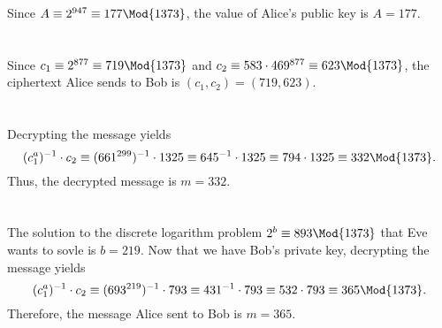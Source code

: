 \documentclass[
  coursecode={MTHE 418},
  assignmentname={Homework \homeworknumber},
  studentnumber=20053722,
  name={Bryan Hoang},
  draft,
]{
  ltxanswer%
}
\begin{document}
  \begin{questions}
    \setcounter{question}{\questionnumber}
    \addtocounter{question}{-1}
    \question[10]\
    \begin{parts}
      \part{}
      \begin{solution}
        Since \(A\equiv2^{947}\equiv 177 \Mod{1373}\), the value of Alice's public key is \(\boxed{A=177}\).
      \end{solution}

      \part{}
      \begin{solution}
        Since \(c_{1}\equiv2^{877}\equiv719 \Mod{1373}\) and \(c_{2}\equiv583\cdot469^{877}\equiv623 \Mod{1373}\), the ciphertext Alice sends to Bob is \(\boxed{(c_{1},c_{2})=(719,623)}\).
      \end{solution}

      \part{}
      \begin{solution}
        Decrypting the message yields
        \begin{equation*}
          (c_{1}^{a})^{-1} \cdot c_{2} \equiv (661^{299})^{-1} \cdot 1325 \equiv 645^{-1} \cdot 1325 \equiv 794 \cdot 1325 \equiv 332 \Mod{1373}.
        \end{equation*}
        Thus, the decrypted message is \(\boxed{m=332}\).
      \end{solution}

      \part{}
      \begin{solution}
        The solution to the discrete logarithm problem \(2^{b}\equiv893 \Mod{1373}\) that Eve wants to sovle is \(\boxed{b=219}\). Now that we have Bob's private key, decrypting the message yields
        \begin{equation*}
          (c_{1}^{a})^{-1} \cdot c_{2} \equiv (693^{219})^{-1} \cdot 793 \equiv 431^{-1} \cdot 793 \equiv 532 \cdot 793 \equiv 365 \Mod{1373}.
        \end{equation*}
        Therefore, the message Alice sent to Bob is \(\boxed{m=365}\).
      \end{solution}
    \end{parts}
  \end{questions}
\end{document}

